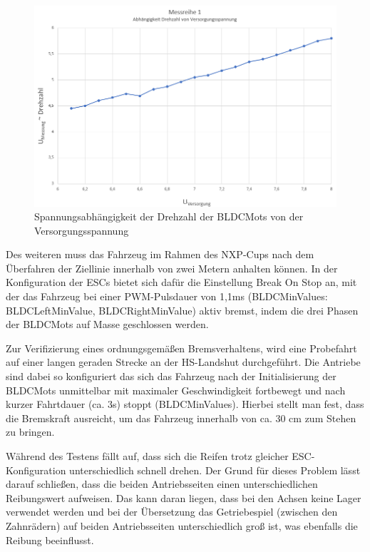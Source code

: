 \begin{figure}[H] %
\includegraphics[width=.90\textwidth]{sec4/images/PruefstandMess02} 
\centering
\captionsetup{width=.95\textwidth}
\caption [Spannungsabhängigkeit der Drehzahl von der Versorgungsspannung]{Spannungsabhängigkeit der Drehzahl der \acp{BLDCMot} von der Versorgungsspannung}\centering
\label{fig:Pruefstand02}
\end{figure}

Des weiteren muss das Fahrzeug im Rahmen des NXP-Cups nach dem Überfahren der Ziellinie innerhalb von zwei Metern anhalten können. In der Konfiguration der \acp{ESC} bietet sich dafür die Einstellung \glqq{}Break On Stop\grqq{} an, mit der das Fahrzeug bei einer PWM-Pulsdauer von 1,1ms (BLDCMinValues: BLDCLeftMinValue, BLDCRightMinValue) aktiv bremst, indem die drei Phasen der \acp{BLDCMot} auf Masse geschlossen werden.\vspace{11pt}

Zur Verifizierung eines ordnungsgemäßen Bremsverhaltens, wird eine Probefahrt auf einer langen geraden Strecke an der HS-Landshut durchgeführt. Die Antriebe sind dabei so konfiguriert das sich das Fahrzeug nach der Initialisierung der \acp{BLDCMot} unmittelbar mit maximaler Geschwindigkeit fortbewegt und nach kurzer Fahrtdauer (ca. 3s) stoppt (BLDCMinValues). Hierbei stellt man fest, dass die Bremskraft ausreicht, um das Fahrzeug innerhalb von ca. 30 cm zum Stehen zu bringen.\vspace{11pt}

Während des Testens fällt auf, dass sich die Reifen trotz gleicher ESC-Konfiguration unterschiedlich schnell drehen. Der Grund für dieses Problem lässt darauf schließen, dass die beiden Antriebsseiten einen unterschiedlichen Reibungswert aufweisen. Das kann daran liegen, dass bei den Achsen keine Lager verwendet werden und bei der Übersetzung das Getriebespiel (zwischen den Zahnrädern) auf beiden Antriebsseiten unterschiedlich groß ist, was ebenfalls die Reibung beeinflusst.\vspace{11pt}

